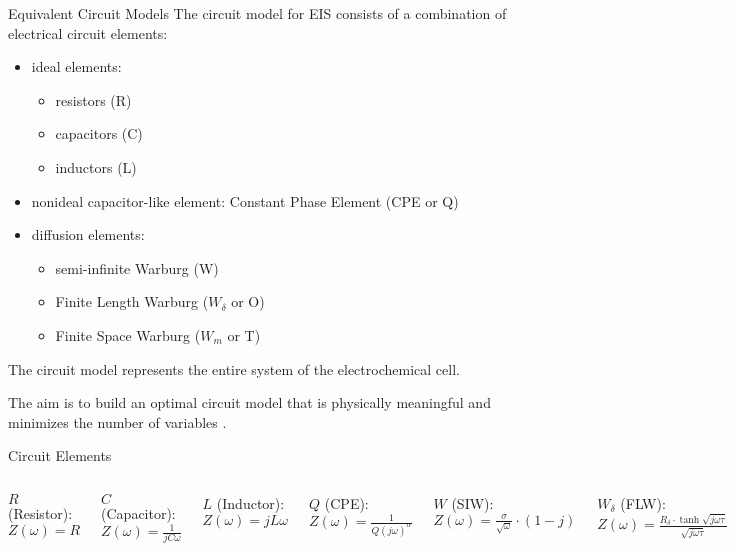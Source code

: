 \documentclass[10pt,compress,handout]{beamer}
\begin{document}
    \begin{frame}{Equivalent Circuit Models}
        The circuit model for EIS consists of a combination of electrical circuit elements\citep{orazem2008}:
        \begin{itemize}
            \item ideal elements:
            \begin{itemize}
                \item  resistors (R)
                \item  capacitors (C)
                \item inductors (L)
            \end{itemize}
            \item nonideal capacitor-like element: Constant Phase Element (CPE or Q)
            \item diffusion elements:
            \begin{itemize}
                \item semi-infinite Warburg (W)
                \item Finite Length Warburg ($W_{\delta}$ or O)
                \item Finite Space Warburg ($W_m$ or T)
            \end{itemize}
        \end{itemize}
        The circuit model represents the entire system of the electrochemical cell.
    
        The aim is to build an optimal circuit model that is physically meaningful and minimizes the
        number of variables \citep{boukamp1986}.
    \end{frame}

    \begin{frame}{Circuit Elements}
        \begin{columns}
                $R$ (Resistor): $Z(\omega)=R$ 

                $C$ (Capacitor): $Z(\omega)=\frac{1}{jC\omega}$

                $L$ (Inductor): $Z(\omega)=jL\omega$

                $Q$ (CPE\footnotemark[4]): $Z(\omega)=\frac{1}{Q(j\omega)^{\alpha}}$

                $W$ (SIW\footnotemark[1]): $Z(\omega)=\frac{\sigma}{\sqrt{\omega}} \cdot (1-j)$
                
                $W_{\delta}$ (FLW\footnotemark[2]): $Z(\omega)=\frac{R_{\delta} \cdot \tanh \sqrt{j\omega\tau}}{\sqrt{j\omega\tau}}$
                
                $W_m$ (FSW\footnotemark[3]): $Z(\omega)=\frac{R_{m} \cdot \coth \sqrt{j\omega\tau}}{\sqrt{j\omega\tau}}$
                \texttt{[image: EIS-example-np\_circuit\_elements]}
        \end{columns}
    \end{frame}
    
\end{document}

